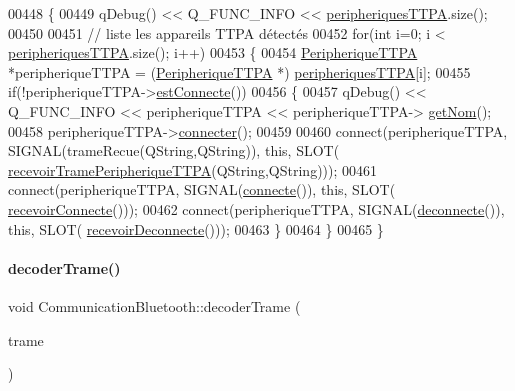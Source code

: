 \begin{DoxyCode}
00448 \{
00449     qDebug() << Q\_FUNC\_INFO << \hyperlink{class_communication_bluetooth_a656a80f8216d2a4db7cf2f865365e562}{peripheriquesTTPA}.size();
00450 
00451     \textcolor{comment}{// liste les appareils TTPA détectés}
00452     \textcolor{keywordflow}{for}(\textcolor{keywordtype}{int} i=0; i < \hyperlink{class_communication_bluetooth_a656a80f8216d2a4db7cf2f865365e562}{peripheriquesTTPA}.size(); i++)
00453     \{
00454         \hyperlink{class_peripherique_t_t_p_a}{PeripheriqueTTPA} *peripheriqueTTPA = (\hyperlink{class_peripherique_t_t_p_a}{PeripheriqueTTPA} *)
      \hyperlink{class_communication_bluetooth_a656a80f8216d2a4db7cf2f865365e562}{peripheriquesTTPA}[i];
00455         \textcolor{keywordflow}{if}(!peripheriqueTTPA->\hyperlink{class_peripherique_t_t_p_a_a33991b646ef2a49e79bac478b5f722c7}{estConnecte}())
00456         \{
00457             qDebug() << Q\_FUNC\_INFO << peripheriqueTTPA << peripheriqueTTPA->
      \hyperlink{class_peripherique_t_t_p_a_abb04680791a7e778ac3808b5d218421f}{getNom}();
00458             peripheriqueTTPA->\hyperlink{class_peripherique_t_t_p_a_a8afa92f7c3ae6e1edc30f5c8b386af81}{connecter}();            
00459 
00460             connect(peripheriqueTTPA, SIGNAL(trameRecue(QString,QString)), \textcolor{keyword}{this}, SLOT(
      \hyperlink{class_communication_bluetooth_ae50bbbf70a5afdea0a0c4d3322e90e40}{recevoirTramePeripheriqueTTPA}(QString,QString)));
00461             connect(peripheriqueTTPA, SIGNAL(\hyperlink{class_communication_bluetooth_a76f44488775d68071d43b418a7a1c75e}{connecte}()), \textcolor{keyword}{this}, SLOT(
      \hyperlink{class_communication_bluetooth_aee7edc20fc1fdfd5a5a1c228c1319531}{recevoirConnecte}()));
00462             connect(peripheriqueTTPA, SIGNAL(\hyperlink{class_communication_bluetooth_abab4c8889f42c8b818895af96863480e}{deconnecte}()), \textcolor{keyword}{this}, SLOT(
      \hyperlink{class_communication_bluetooth_af187cbc294befb656070f9817763104b}{recevoirDeconnecte}()));
00463         \}
00464     \}
00465 \}
\end{DoxyCode}
\mbox{\label{class_communication_bluetooth_a6b53f12131d9323cec8f2a03fe716e6a}} 
\paragraph{\texorpdfstring{decoder\+Trame()}{decoderTrame()}}
{\footnotesize\ttfamily void Communication\+Bluetooth\+::decoder\+Trame (\begin{DoxyParamCaption}\item[{Q\+String}]{trame }\end{DoxyParamCaption})\hspace{0.3cm}{\ttfamily [private]}}


